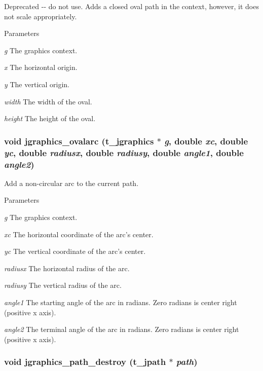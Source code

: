 Deprecated -\/-\/ do not use. Adds a closed oval path in the context, however, it does not scale appropriately.


\begin{DoxyParams}{Parameters}
\item[{\em g}]The graphics context. \item[{\em x}]The horizontal origin. \item[{\em y}]The vertical origin. \item[{\em width}]The width of the oval. \item[{\em height}]The height of the oval. \end{DoxyParams}
\hypertarget{group__jgraphics_ga2dde9a34e2863ab5244057c4ef775a0c}{
\subsubsection[{jgraphics\_\-ovalarc}]{\setlength{\rightskip}{0pt plus 5cm}void jgraphics\_\-ovalarc ({\bf t\_\-jgraphics} $\ast$ {\em g}, \/  double {\em xc}, \/  double {\em yc}, \/  double {\em radiusx}, \/  double {\em radiusy}, \/  double {\em angle1}, \/  double {\em angle2})}}
\label{group__jgraphics_ga2dde9a34e2863ab5244057c4ef775a0c}


Add a non-\/circular arc to the current path. 
\begin{DoxyParams}{Parameters}
\item[{\em g}]The graphics context. \item[{\em xc}]The horizontal coordinate of the arc's center. \item[{\em yc}]The vertical coordinate of the arc's center. \item[{\em radiusx}]The horizontal radius of the arc. \item[{\em radiusy}]The vertical radius of the arc. \item[{\em angle1}]The starting angle of the arc in radians. Zero radians is center right (positive x axis). \item[{\em angle2}]The terminal angle of the arc in radians. Zero radians is center right (positive x axis). \end{DoxyParams}
\hypertarget{group__jgraphics_gaff6abc629030d751899d99c61970df79}{
\subsubsection[{jgraphics\_\-path\_\-destroy}]{\setlength{\rightskip}{0pt plus 5cm}void jgraphics\_\-path\_\-destroy ({\bf t\_\-jpath} $\ast$ {\em path})}}
\label{group__jgraphics_gaff6abc629030d751899d99c61970df79}


